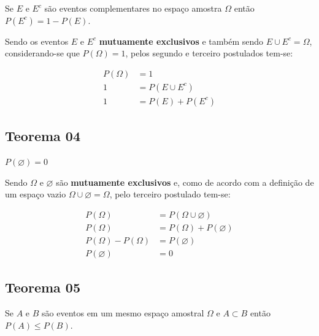 \documentclass[
]{book}
\begin{document}
\hfill\break

Se \(E\) e \(E^{c}\) são eventos complementares no espaço amostra \(\Omega\) então \(P(E^{c}) = 1 - P(E)\).

\hfill\break

Sendo os eventos \(E\) e \(E^{c}\) \textbf{mutuamente exclusivos} e também sendo \(E \cup E^{c} = \Omega\), considerando-se que \(P(\Omega) = 1\), pelos segundo e terceiro postulados tem-se:

\hfill\break

\begin{align*}
P(\Omega) & = 1 \\
1 & = P(E \cup E^{c}) \\
1 & = P(E) + P(E^{c})
\end{align*}

\hfill\break

\hypertarget{teorema-04}{%
\subsection{Teorema 04}\label{teorema-04}}

\hfill\break

\(P(\varnothing)=0\)

\hfill\break

Sendo \(\Omega\) e \(\varnothing\) são \textbf{mutuamente exclusivos} e, como de acordo com a definição de um espaço vazio \(\Omega \cup \varnothing = \Omega\), pelo terceiro postulado tem-se:

\hfill\break

\begin{align*}
P(\Omega) & = P(\Omega \cup \varnothing)\\ 
P(\Omega) & = P(\Omega) + P(\varnothing)\\ 
P(\Omega) - P(\Omega) & = P(\varnothing)\\ 
P(\varnothing) & =0
\end{align*}

\hfill\break

\hypertarget{teorema-05}{%
\subsection{Teorema 05}\label{teorema-05}}

\hfill\break

Se \(A\) e \(B\) são eventos em um mesmo espaço amostral \(\Omega\) e \(A \subset B\) então \(P(A) \leq P(B)\).

\hfill\break
\end{document}
